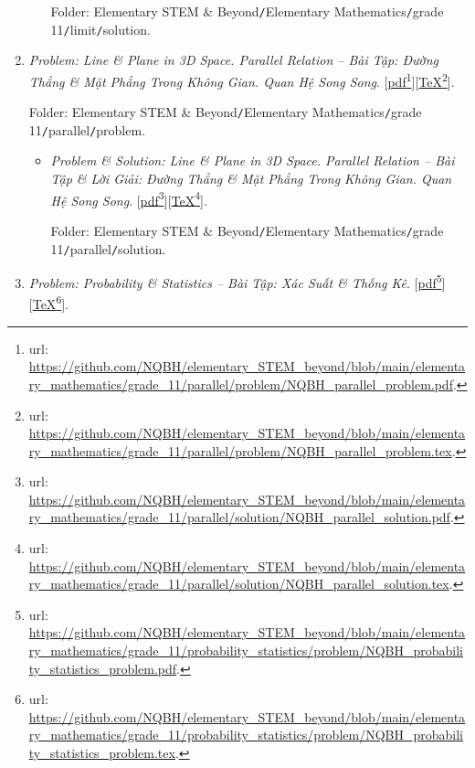 \documentclass[12pt,oneside]{book}
\begin{document}
\begin{enumerate}
\begin{itemize}
		Folder: {\sf Elementary STEM \& Beyond{\tt/}Elementary Mathematics{\tt/}grade 11{\tt/}limit{\tt/}solution}.
	\end{itemize}
	\item {\it Problem: Line \& Plane in 3D Space. Parallel Relation -- Bài Tập: Đường Thẳng \& Mặt Phẳng Trong Không Gian. Quan Hệ Song Song}. [\href{https://github.com/NQBH/elementary_STEM_beyond/blob/main/elementary_mathematics/grade_11/parallel/problem/NQBH_parallel_problem.pdf}{pdf}\footnote{{\sc url}: \url{https://github.com/NQBH/elementary_STEM_beyond/blob/main/elementary_mathematics/grade_11/parallel/problem/NQBH_parallel_problem.pdf}.}][\href{https://github.com/NQBH/elementary_STEM_beyond/blob/main/elementary_mathematics/grade_11/parallel/problem/NQBH_parallel_problem.tex}{\TeX}\footnote{{\sc url}: \url{https://github.com/NQBH/elementary_STEM_beyond/blob/main/elementary_mathematics/grade_11/parallel/problem/NQBH_parallel_problem.tex}.}].
	
	Folder: {\sf Elementary STEM \& Beyond{\tt/}Elementary Mathematics{\tt/}grade 11{\tt/}parallel{\tt/}problem}.
	\begin{itemize}
		\item {\it Problem \& Solution: Line \& Plane in 3D Space. Parallel Relation -- Bài Tập \& Lời Giải: Đường Thẳng \& Mặt Phẳng Trong Không Gian. Quan Hệ Song Song}. [\href{https://github.com/NQBH/elementary_STEM_beyond/blob/main/elementary_mathematics/grade_11/parallel/solution/NQBH_parallel_solution.pdf}{pdf}\footnote{{\sc url}: \url{https://github.com/NQBH/elementary_STEM_beyond/blob/main/elementary_mathematics/grade_11/parallel/solution/NQBH_parallel_solution.pdf}.}][\href{https://github.com/NQBH/elementary_STEM_beyond/blob/main/elementary_mathematics/grade_11/parallel/solution/NQBH_parallel_solution.tex}{\TeX}\footnote{{\sc url}: \url{https://github.com/NQBH/elementary_STEM_beyond/blob/main/elementary_mathematics/grade_11/parallel/solution/NQBH_parallel_solution.tex}.}].
		
		Folder: {\sf Elementary STEM \& Beyond{\tt/}Elementary Mathematics{\tt/}grade 11{\tt/}parallel{\tt/}solution}.
	\end{itemize}
	\item {\it Problem: Probability \& Statistics -- Bài Tập: Xác Suất \& Thống Kê}. [\href{https://github.com/NQBH/elementary_STEM_beyond/blob/main/elementary_mathematics/grade_11/probability_statistics/problem/NQBH_probability_statistics_problem.pdf}{pdf}\footnote{{\sc url}: \url{https://github.com/NQBH/elementary_STEM_beyond/blob/main/elementary_mathematics/grade_11/probability_statistics/problem/NQBH_probability_statistics_problem.pdf}.}][\href{https://github.com/NQBH/elementary_STEM_beyond/blob/main/elementary_mathematics/grade_11/probability_statistics/problem/NQBH_probability_statistics_problem.tex}{\TeX}\footnote{{\sc url}: \url{https://github.com/NQBH/elementary_STEM_beyond/blob/main/elementary_mathematics/grade_11/probability_statistics/problem/NQBH_probability_statistics_problem.tex}.}].
	

\end{enumerate}
\end{document}
